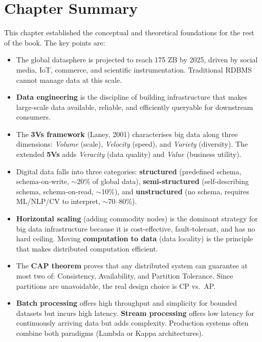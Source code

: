 \section*{Chapter Summary}
\label{sec:ch1-summary}

This chapter established the conceptual and theoretical foundations for
the rest of the book. The key points are:

\begin{itemize}
  \item The global datasphere is projected to reach 175 ZB by 2025,
        driven by social media, IoT, commerce, and scientific
        instrumentation. Traditional RDBMS cannot manage data at this
        scale.

  \item \textbf{Data engineering} is the discipline of building
        infrastructure that makes large-scale data available, reliable,
        and efficiently queryable for downstream consumers.

  \item The \textbf{3Vs framework} (Laney, 2001) characterises big data
        along three dimensions: \emph{Volume} (scale), \emph{Velocity}
        (speed), and \emph{Variety} (diversity). The extended \textbf{5Vs}
        adds \emph{Veracity} (data quality) and \emph{Value} (business
        utility).

  \item Digital data falls into three categories: \textbf{structured}
        (predefined schema, schema-on-write, $\sim$20\% of global data),
        \textbf{semi-structured} (self-describing schema, schema-on-read,
        $\sim$10\%), and \textbf{unstructured} (no schema, requires
        ML/NLP/CV to interpret, $\sim$70--80\%).

  \item \textbf{Horizontal scaling} (adding commodity nodes) is the
        dominant strategy for big data infrastructure because it is
        cost-effective, fault-tolerant, and has no hard ceiling.
        Moving \textbf{computation to data} (data locality) is the
        principle that makes distributed computation efficient.

  \item The \textbf{CAP theorem} proves that any distributed system can
        guarantee at most two of: Consistency, Availability, and Partition
        Tolerance. Since partitions are unavoidable, the real design choice
        is CP vs.\ AP.

  \item \textbf{Batch processing} offers high throughput and simplicity
        for bounded datasets but incurs high latency. \textbf{Stream
        processing} offers low latency for continuously arriving data but
        adds complexity. Production systems often combine both paradigms
        (Lambda or Kappa architectures).
\end{itemize}

